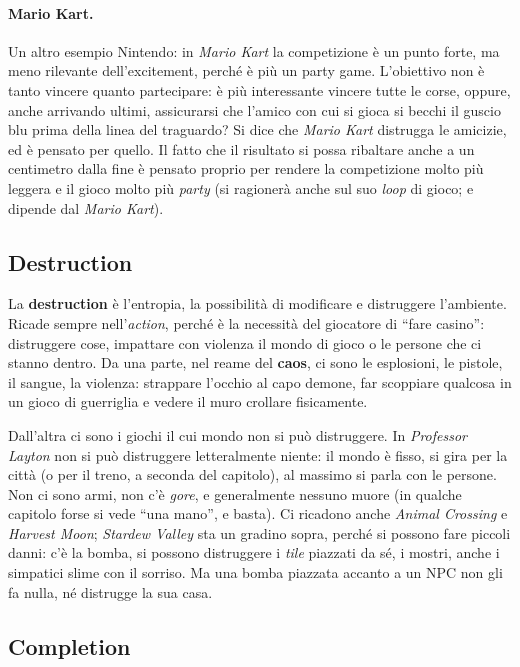 \paragraph{Mario Kart.} Un altro esempio Nintendo: in \emph{Mario Kart} la
competizione è un punto forte, ma meno rilevante dell'excitement, perché è
più un party game. L'obiettivo non è tanto vincere quanto partecipare: è più
interessante vincere tutte le corse, oppure, anche arrivando ultimi,
assicurarsi che l'amico con cui si gioca si becchi il guscio blu prima della
linea del traguardo? Si dice che \emph{Mario Kart} distrugga le amicizie, ed è
pensato per quello. Il fatto che il risultato si possa ribaltare anche a un
centimetro dalla fine è pensato proprio per rendere la competizione molto più
leggera e il gioco molto più \emph{party} (si ragionerà anche sul suo
\emph{loop} di gioco; e dipende dal \emph{Mario Kart}).

\subsection{Destruction}

La \textbf{destruction} è l'entropia, la possibilità di modificare e
distruggere l'ambiente. Ricade sempre nell'\emph{action}, perché è la
necessità del giocatore di ``fare casino'': distruggere cose, impattare con
violenza il mondo di gioco o le persone che ci stanno dentro. Da una parte,
nel reame del \textbf{caos}, ci sono le esplosioni, le pistole, il sangue, la
violenza: strappare l'occhio al capo demone, far scoppiare qualcosa in un
gioco di guerriglia e vedere il muro crollare fisicamente.

Dall'altra ci sono i giochi il cui mondo non si può distruggere. In
\emph{Professor Layton} non si può distruggere letteralmente niente: il mondo
è fisso, si gira per la città (o per il treno, a seconda del capitolo), al
massimo si parla con le persone. Non ci sono armi, non c'è \emph{gore}, e
generalmente nessuno muore (in qualche capitolo forse si vede ``una mano'', e
basta). Ci ricadono anche \emph{Animal Crossing} e \emph{Harvest Moon};
\emph{Stardew Valley} sta un gradino sopra, perché si possono fare piccoli
danni: c'è la bomba, si possono distruggere i \emph{tile} piazzati da sé, i
mostri, anche i simpatici slime con il sorriso. Ma una bomba piazzata accanto
a un NPC non gli fa nulla, né distrugge la sua casa.

\subsection{Completion}

